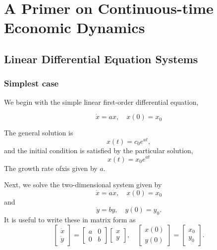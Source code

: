 \chapter{A Primer on Continuous-time Economic Dynamics}

\section{Linear Differential Equation Systems} %
\label{sec:linear_differential_equation_systems}

\subsection{Simplest case} %
\label{sub:simplest_case}

We begin with the simple linear first-order differential equation,

\begin{equation*}
\dot{x}=ax, \quad x(0)=x_{0}
\end{equation*}

The general solution is
\begin{equation*}
x(t)=c_{0}e^{at},
\end{equation*}
and the initial condition is satisfied by the particular solution,
\begin{equation*}
x(t)=x_{0}e^{at}
\end{equation*}
The growth rate ofxis given by $a$.

Next, we solve the two-dimensional system given by
\begin{equation*}
    \dot{x}=ax,\quad x(0)=x_{0}
\end{equation*}
and
\begin{equation*}
    \dot{y}=by,\quad y(0)=y_{0}.
\end{equation*}
It is useful to write these in matrix form as
\begin{equation*}
\begin{bmatrix}
\dot{x}\\ \dot{y}
\end{bmatrix}
=\begin{bmatrix}
a & 0 \\
0 & b
\end{bmatrix}
\begin{bmatrix}
x\\
y
\end{bmatrix}
,\quad
\begin{bmatrix}
x(0)\\
y(0)
\end{bmatrix}
=\begin{bmatrix}
x_{0}\\y_{0}
\end{bmatrix}.
\end{equation*}

